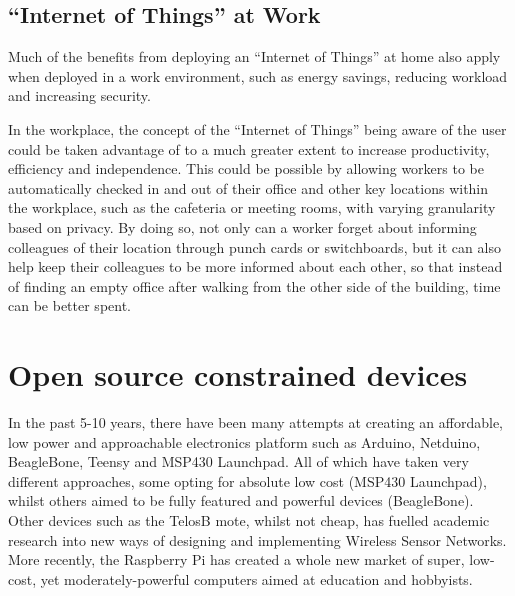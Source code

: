 \subsection{``Internet of Things'' at Work} %
\label{sub:work}
Much of the benefits from deploying an ``Internet of Things'' at home also apply when deployed in a work environment, such as energy savings, reducing workload and increasing security.

In the workplace, the concept of the ``Internet of Things'' being aware of the user could be taken advantage of to a much greater extent to increase productivity, efficiency and independence. This could be possible by allowing workers to be automatically checked in and out of their office and other key locations within the workplace, such as the cafeteria or meeting rooms, with varying granularity based on privacy. By doing so, not only can a worker forget about informing colleagues of their location through punch cards or switchboards, but it can also help keep their colleagues to be more informed about each other, so that instead of finding an empty office after walking from the other side of the building, time can be better spent.







\newpage
\section{Open source constrained devices} %
\label{sec:open_source_constrained_devices}

In the past 5-10 years, there have been many attempts at creating an affordable, low power and approachable electronics platform such as Arduino, Netduino, BeagleBone, Teensy and MSP430 Launchpad. All of which have taken very different approaches, some opting for absolute low cost (MSP430 Launchpad), whilst others aimed to be fully featured and powerful devices (BeagleBone). Other devices such as the TelosB mote, whilst not cheap, has fuelled academic research into new ways of designing and implementing Wireless Sensor Networks. More recently, the Raspberry Pi has created a whole new market of super, low-cost, yet moderately-powerful computers aimed at education and hobbyists.

